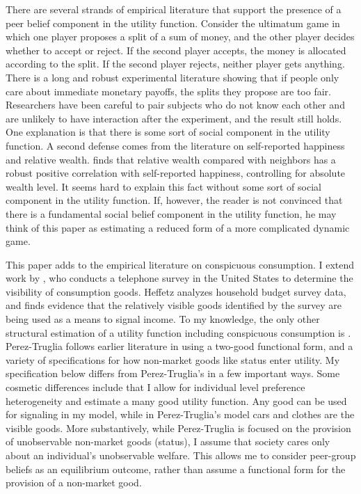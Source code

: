 \documentclass[12pt]{article}
\begin{document}
There are several strands of empirical literature that support the presence of a peer belief component in the utility function.  Consider the ultimatum game in which one player proposes a split of a sum of money, and the other player decides whether to accept or reject.  If the second player accepts, the money is allocated according to the split. If the second player rejects, neither player gets anything.  There is a long and robust experimental literature showing that if people only care about immediate monetary payoffs, the splits they propose are too fair.  Researchers have been careful to pair subjects who do not know each other and are unlikely to have interaction after the experiment, and the result still holds.  One explanation is that there is some sort of social component in the utility function. \citep{FehrSchmidt1999,BoltonOckenfels2000}  A second defense comes from the literature on self-reported happiness and relative wealth.  \citet{Luttmer2004} finds that relative wealth compared with neighbors has a robust positive correlation  with self-reported happiness, controlling for absolute wealth level.  It seems hard to explain this fact without some sort of social component in the utility function.  If, however, the reader is not convinced that there is a fundamental social belief component in the utility function, he may think of this paper as estimating a reduced form of a more complicated dynamic game.

This paper adds to the empirical literature on conspicuous consumption.\citep{Blochetal2004,Charlesetal2009,MoavNeeman2010,MoavNeeman2012}  I extend work by \citet{Heffetz2011}, who conducts a telephone survey in the United States to determine the visibility of consumption goods.  Heffetz analyzes household budget survey data, and finds evidence that the relatively visible goods identified by the survey are being used as a means to signal income.  To my knowledge, the only other structural estimation of a utility function including conspicuous consumption is \citet{perez2013measuring}.  Perez-Truglia follows earlier literature in using a two-good functional form, and a variety of specifications for how non-market goods like status enter utility.  My specification below differs from Perez-Truglia's in a few important ways.  Some cosmetic differences include that I allow for individual level preference heterogeneity and estimate a many good utility function.  Any good can be used for signaling in my model, while in Perez-Truglia's model cars and clothes are the visible goods.  More substantively, while Perez-Truglia is focused on the provision of unobservable non-market goods (status), I assume that society cares only about an individual's unobservable welfare.  This allows me to consider peer-group beliefs as an equilibrium outcome, rather than assume a functional form for the provision of a non-market good.
\end{document}
